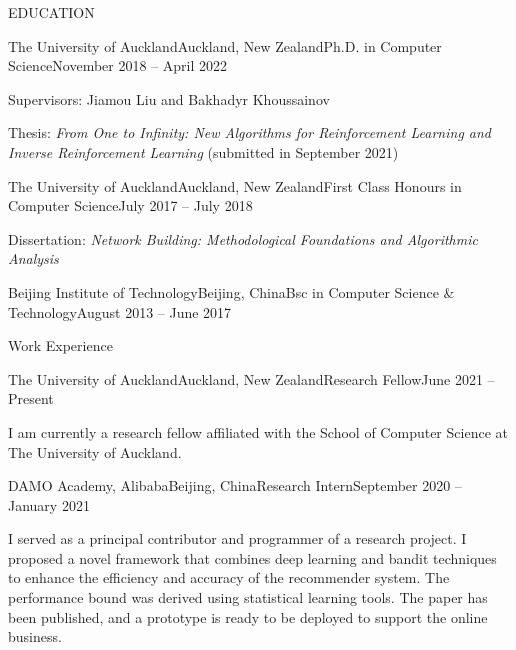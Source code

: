 \documentclass{resume} %
\begin{document}

\begin{rSection}{EDUCATION}

\begin{rSubsection}{The University of Auckland}{Auckland, New Zealand}{Ph.D. in Computer Science}{November 2018 -- April 2022}%
\item Supervisors: Jiamou Liu and Bakhadyr Khoussainov
\item Thesis: {\em From One to Infinity: New Algorithms for Reinforcement Learning and Inverse Reinforcement Learning} (submitted in September 2021)
\end{rSubsection}

\begin{rSubsection}{The University of Auckland}{Auckland, New Zealand}{First Class Honours in Computer Science}{July 2017 -- July 2018}
\item Dissertation: {\em Network Building: Methodological Foundations and Algorithmic Analysis}
\end{rSubsection}

\begin{rSubsection}{Beijing Institute of Technology}{Beijing, China}{Bsc in Computer Science \& Technology}{August 2013 -- June 2017}
\end{rSubsection}
\end{rSection}


\begin{rSection}{Work Experience}
\begin{rSubsection}{The University of Auckland}{Auckland, New Zealand}{Research Fellow}{June 2021 -- Present}
\item I am currently a research fellow affiliated with the School of Computer Science at The University of Auckland. 
\end{rSubsection}
	\begin{rSubsection}{DAMO Academy, Alibaba}{Beijing, China}{Research Intern}{September 2020 -- January 2021}
\item I served as a principal contributor and programmer of a research project. I proposed a novel framework that combines deep learning and bandit techniques to enhance the efficiency and accuracy of the recommender system. The performance bound was derived using statistical learning tools. The paper has been published, and a prototype is ready to be deployed to support the online business. 
\end{rSubsection}
\end{rSection}
\end{document}
